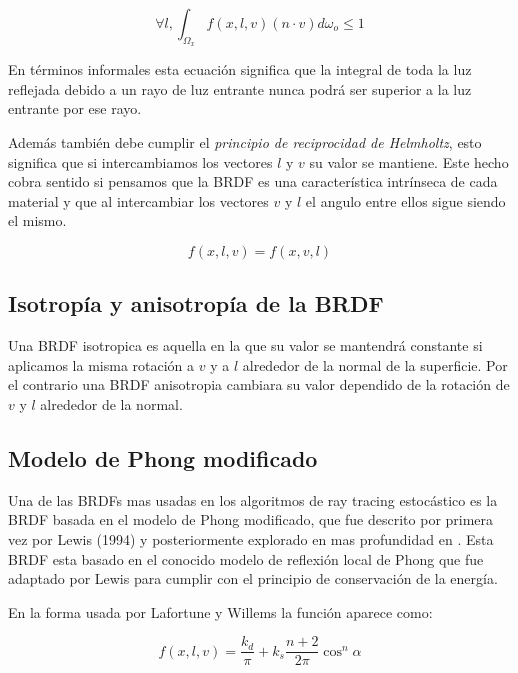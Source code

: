 \begin{equation}
\forall l, \int_{\Omega_x} f(x,l,v) (n \cdot v) d\omega_o \leq 1
\end{equation}

En términos informales esta ecuación significa que la integral de toda la luz reflejada debido a un rayo de luz entrante nunca podrá ser superior a la luz entrante por ese rayo.

\medskip
Además también debe cumplir el \emph{principio de reciprocidad de Helmholtz}, esto significa que si intercambiamos los vectores $l$ y $v$ su valor se mantiene. Este hecho cobra sentido si pensamos que la BRDF es una característica intrínseca de cada material y que al intercambiar los vectores $v$ y $l$ el angulo entre ellos sigue siendo el mismo.

\begin{equation}
f(x, l, v) = f(x, v, l)
\end{equation} 

\subsection{Isotropía y anisotropía de la BRDF}

Una BRDF isotropica es aquella en la que su valor se mantendrá constante si aplicamos la misma rotación a $v$ y a $l$ alrededor de la normal de la superficie. Por el contrario una BRDF anisotropia cambiara su valor dependido de la rotación de $v$ y $l$ alrededor de la normal.

\clearpage

\subsection{Modelo de Phong modificado}
Una de las BRDFs mas usadas en los algoritmos de ray tracing estocástico es la BRDF basada en el modelo de Phong modificado, que fue descrito por primera vez por Lewis (1994) \nocite{Lewis1994} y posteriormente explorado en mas profundidad en \cite{Lafortune1994}. Esta BRDF esta basado en el conocido modelo de reflexión local de Phong \cite{Phong1975} que fue adaptado por Lewis para cumplir con el principio de conservación de la energía.

En la forma usada por Lafortune y Willems la función aparece como:

\begin{equation}
f(x, l, v) = \frac{k_d}{\pi} + k_s \frac{n + 2}{2 \pi} \cos^n\alpha
\end{equation}

